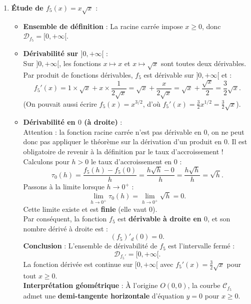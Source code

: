 \documentclass[11pt,a4paper]{article}
\begin{document}
\begin{correctionbox}
\begin{enumerate}[label=\textbf{\arabic*.}]
    \item \textbf{Étude de $f_5(x) = x\sqrt{x}$} :
    \begin{itemize}
        \item \textbf{Ensemble de définition} : La racine carrée impose $x \ge 0$, donc $\mathcal{D}_{f_5} = [0, +\infty[$.
        \item \textbf{Dérivabilité sur $]0, +\infty[$} :\\
        Sur $]0, +\infty[$, les fonctions $x \mapsto x$ et $x \mapsto \sqrt{x}$ sont toutes deux dérivables. Par produit de fonctions dérivables, $f_5$ est dérivable sur $]0, +\infty[$ et :
        \[
        f_5'(x) = 1 \times \sqrt{x} + x \times \frac{1}{2\sqrt{x}} = \sqrt{x} + \frac{x}{2\sqrt{x}} = \sqrt{x} + \frac{\sqrt{x}}{2} = \frac{3}{2}\sqrt{x}.
        \]
        (On pouvait aussi écrire $f_5(x) = x^{3/2}$, d'où $f_5'(x) = \frac{3}{2}x^{1/2} = \frac{3}{2}\sqrt{x}$).
        \item \textbf{Dérivabilité en $0$ (à droite)} :\\
        Attention : la fonction racine carrée n'est pas dérivable en $0$, on ne peut donc pas appliquer le théorème sur la dérivation d'un produit en $0$. Il est obligatoire de revenir à la définition par le taux d'accroissement !\\
        Calculons pour $h > 0$ le taux d'accroissement en $0$ :
        \[
        \tau_0(h) = \frac{f_5(h) - f_5(0)}{h} = \frac{h\sqrt{h} - 0}{h} = \frac{h\sqrt{h}}{h} = \sqrt{h}.
        \]
        Passons à la limite lorsque $h \to 0^+$ :
        \[
        \lim_{h \to 0^+} \tau_0(h) = \lim_{h \to 0^+} \sqrt{h} = 0.
        \]
        Cette limite existe et est \textbf{finie} (elle vaut $0$).\\
        Par conséquent, la fonction $f_5$ est \textbf{dérivable à droite en $0$}, et son nombre dérivé à droite est :
        \[
        (f_5)'_d(0) = 0.
        \]
        \textbf{Conclusion} : L'ensemble de dérivabilité de $f_5$ est l'intervalle fermé :
        \[
        \mathcal{D}_{f_5'} = [0, +\infty[.
        \]
        La fonction dérivée est continue sur $[0, +\infty[$ avec $f_5'(x) = \frac{3}{2}\sqrt{x}$ pour tout $x \ge 0$.\\
        \textbf{Interprétation géométrique} : À l'origine $O(0, 0)$, la courbe $\mathcal{C}_{f_5}$ admet une \textbf{demi-tangente horizontale} d'équation $y = 0$ pour $x \ge 0$.
    \end{itemize}
\end{enumerate}
\end{correctionbox}
\end{document}
